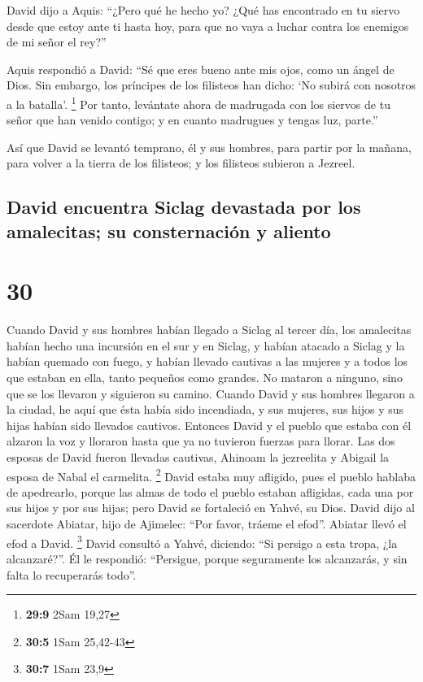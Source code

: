  David dijo a Aquis: ``¿Pero qué he hecho yo? ¿Qué has
encontrado en tu siervo desde que estoy ante ti hasta hoy, para que no
vaya a luchar contra los enemigos de mi señor el rey?''

 Aquis respondió a David: ``Sé que eres bueno ante mis
ojos, como un ángel de Dios. Sin embargo, los príncipes de los filisteos
han dicho: `No subirá con nosotros a la batalla'. \footnote{\textbf{29:9}
  2Sam 19,27}  Por tanto, levántate ahora de madrugada
con los siervos de tu señor que han venido contigo; y en cuanto
madrugues y tengas luz, parte.''

 Así que David se levantó temprano, él y sus hombres,
para partir por la mañana, para volver a la tierra de los filisteos; y
los filisteos subieron a Jezreel.

\hypertarget{david-encuentra-siclag-devastada-por-los-amalecitas-su-consternaciuxf3n-y-aliento}{%
\subsection{David encuentra Siclag devastada por los amalecitas; su
consternación y
aliento}\label{david-encuentra-siclag-devastada-por-los-amalecitas-su-consternaciuxf3n-y-aliento}}

\hypertarget{section-29}{%
\section{30}\label{section-29}}

 Cuando David y sus hombres habían llegado a Siclag al
tercer día, los amalecitas habían hecho una incursión en el sur y en
Siclag, y habían atacado a Siclag y la habían quemado con fuego,
 y habían llevado cautivas a las mujeres y a todos los que
estaban en ella, tanto pequeños como grandes. No mataron a ninguno, sino
que se los llevaron y siguieron su camino.  Cuando David y
sus hombres llegaron a la ciudad, he aquí que ésta había sido
incendiada, y sus mujeres, sus hijos y sus hijas habían sido llevados
cautivos.  Entonces David y el pueblo que estaba con él
alzaron la voz y lloraron hasta que ya no tuvieron fuerzas para llorar.
 Las dos esposas de David fueron llevadas cautivas,
Ahinoam la jezreelita y Abigail la esposa de Nabal el carmelita.
\footnote{\textbf{30:5} 1Sam 25,42-43}  David estaba muy
afligido, pues el pueblo hablaba de apedrearlo, porque las almas de todo
el pueblo estaban afligidas, cada una por sus hijos y por sus hijas;
pero David se fortaleció en Yahvé, su Dios.  David dijo al
sacerdote Abiatar, hijo de Ajimelec: ``Por favor, tráeme el efod''.
Abiatar llevó el efod a David. \footnote{\textbf{30:7} 1Sam 23,9}
 David consultó a Yahvé, diciendo: ``Si persigo a esta
tropa, ¿la alcanzaré?''. Él le respondió: ``Persigue, porque seguramente
los alcanzarás, y sin falta lo recuperarás todo''.

